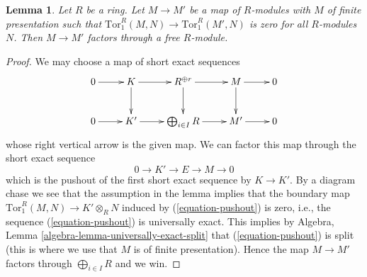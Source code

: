 \documentclass[10pt,a4paper]{amsart}
\theoremstyle{plain}
\newtheorem{lemma}[subsection]{Lemma}
\theoremstyle{definition}
\theoremstyle{remark}
\numberwithin{equation}{subsection}
\begin{document}
\begin{lemma}
\label{lemma-map-tor-1-zero}
Let $R$ be a ring. Let $M \to M'$ be a map of $R$-modules with
$M$ of finite presentation
such that $\text{Tor}_1^R(M, N) \to \text{Tor}_1^R(M', N)$ is zero for all
$R$-modules $N$. Then $M \to M'$ factors through a free $R$-module.
\end{lemma}

\begin{proof}
We may choose a map of short exact sequences
$$
\xymatrix{
0 \ar[r] &
K \ar[r] \ar[d] &
R^{\oplus r} \ar[r] \ar[d] &
M \ar[r] \ar[d] &
0 \\
0 \ar[r] &
K' \ar[r] &
\bigoplus_{i \in I} R \ar[r] &
M' \ar[r] &
0
}
$$
whose right vertical arrow is the given map.
We can factor this map through the short exact sequence
\begin{equation}
\label{equation-pushout}
0 \to K' \to E \to M \to 0
\end{equation}
which is the pushout of the first short exact sequence by $K \to K'$.
By a diagram chase we see that the assumption in the lemma
implies that the boundary map $\text{Tor}_1^R(M, N) \to K' \otimes_R N$
induced by (\ref{equation-pushout}) is zero, i.e., the sequence
(\ref{equation-pushout}) is universally exact. This implies by
Algebra, Lemma \ref{algebra-lemma-universally-exact-split}
that (\ref{equation-pushout}) is split (this is where we use that
$M$ is of finite presentation). Hence the map $M \to M'$
factors through $\bigoplus_{i \in I} R$ and we win.
\end{proof}
\end{document}
